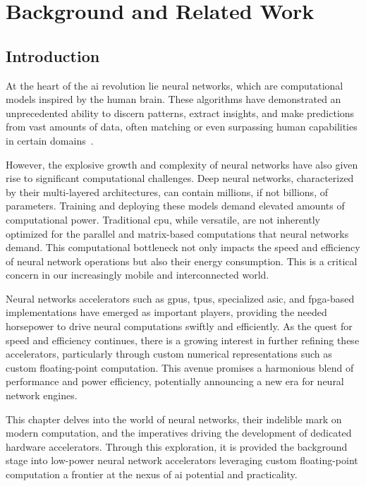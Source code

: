 \chapter{Background and Related Work}\label{chap.background}
\minitoc

\section{Introduction}
At the heart of the \gls{ai} revolution lie neural networks, which are computational models inspired by the human brain. These algorithms have demonstrated an unprecedented ability to discern patterns, extract insights, and make predictions from vast amounts of data, often matching or even surpassing human capabilities in certain domains~\cite{silver2016mastering, gulshan2016development, lake2015human, xiong2016achieving, brown2020language}.

However, the explosive growth and complexity of neural networks have also given rise to significant computational challenges. Deep neural networks, characterized by their multi-layered architectures, can contain millions, if not billions, of parameters. Training and deploying these models demand elevated amounts of computational power. Traditional \gls{cpu}, while versatile, are not inherently optimized for the parallel and matrix-based computations that neural networks demand. This computational bottleneck not only impacts the speed and efficiency of neural network operations but also their energy consumption. This is a critical concern in our increasingly mobile and interconnected world.

Neural networks accelerators such as \glspl{gpu}, \glspl{tpu}, specialized \gls{asic}, and \gls{fpga}-based implementations have emerged as important players, providing the needed horsepower to drive neural computations swiftly and efficiently. As the quest for speed and efficiency continues, there is a growing interest in further refining these accelerators, particularly through custom numerical representations such as custom floating-point computation. This avenue promises a harmonious blend of performance and power efficiency, potentially announcing a new era for neural network engines.

This chapter delves into the world of neural networks, their indelible mark on modern computation, and the imperatives driving the development of dedicated hardware accelerators. Through this exploration, it is provided the background stage into low-power neural network accelerators leveraging custom floating-point computation a frontier at the nexus of \gls{ai} potential and practicality.

